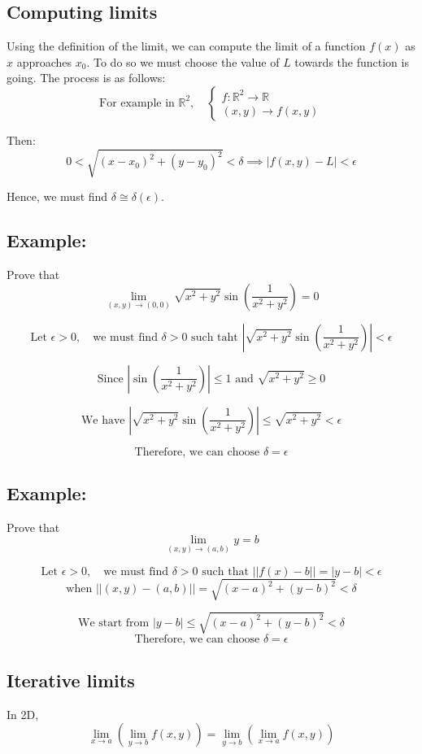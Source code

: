 \documentclass[11pt]{article}
\begin{document}
\subsection{Computing limits}
Using the definition of the limit, we can compute the limit of a function $f(x)$ as $x$ approaches $x_0$. To do so we must choose the value of $L$ towards the function is going. The process is as follows:
\[
\text{For example in } \mathbb{R}^2, \quad 
\begin{cases}
    f : \mathbb{R}^2 \rightarrow \mathbb{R} \\
    (x,y) \rightarrow f(x,y)
\end{cases}
\]

Then:
\[
0 < \sqrt{(x - x_0)^2 + (y - y_0)^2} < \delta \implies |f(x,y) - L| < \epsilon
\]

Hence, we must find $\delta \cong \delta(\epsilon)$.

\subsection*{Example:}
Prove that 
\[
\lim_{(x,y) \to (0,0)} \sqrt{x^2 + y^2} \sin\left(\frac{1}{x^2 + y^2}\right) = 0
\]

\[
\text{Let } \epsilon > 0, \quad \text{we must find } \delta > 0 \text{ such taht } \left|\sqrt{x^2 + y^2} \sin\left(\frac{1}{x^2 + y^2}\right)\right| < \epsilon
\]

\[
\text{Since } \left|\sin\left(\frac{1}{x^2 + y^2}\right)\right| \leq 1 \text{ and } \sqrt{x^2 + y^2} \geq 0
\]

\[
\text{We have } \left|\sqrt{x^2 + y^2} \sin\left(\frac{1}{x^2 + y^2}\right)\right| \leq \sqrt{x^2 + y^2} < \epsilon
\]

\[
\text{Therefore, we can choose } \delta = \epsilon
\]

\subsection*{Example:}
Prove that
\[
\lim_{(x,y) \to (a,b)} y = b
\]

\[
\text{Let } \epsilon > 0, \quad \text{we must find } \delta > 0 \text{ such that } ||f(x) - b|| = |y - b| < \epsilon
\]
\[
\text{when } ||(x,y) - (a,b)|| = \sqrt{(x-a)^2 + (y-b)^2} < \delta
\]

\[
\text{We start from } |y - b| \leq \sqrt{(x-a)^2 + (y-b)^2} < \delta
\]
\[
\text{Therefore, we can choose } \delta = \epsilon
\]

\subsection{Iterative limits}
In 2D, 
\[
\lim_{x \to a} \left(\lim_{y \to b} f(x,y)\right) = \lim_{y \to b} \left(\lim_{x \to a} f(x,y)\right)
\]
\end{document}
